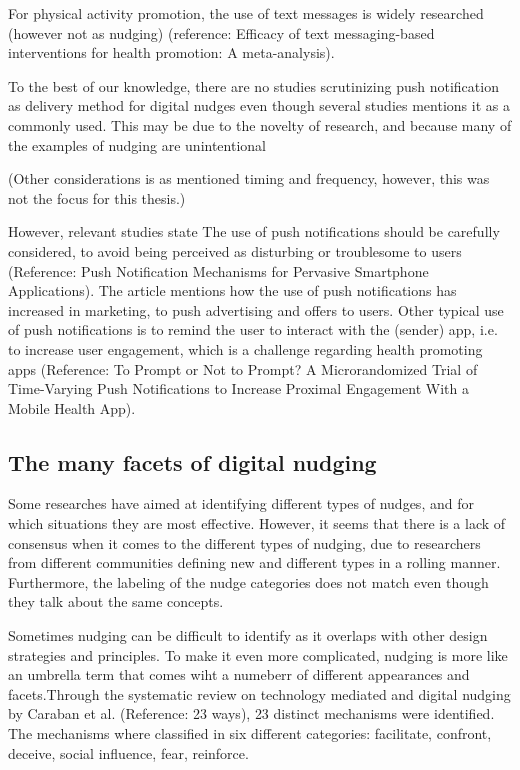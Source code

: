 For physical activity promotion, the use of text messages is widely researched (however not as nudging) (reference: Efficacy of text messaging-based interventions for health promotion: A meta-analysis). 

To the best of our knowledge, there are no studies scrutinizing push notification as delivery method for digital nudges even though several studies mentions it as a commonly used. This may be due to the novelty of research, and because many of the examples of nudging are unintentional

(Other considerations is as mentioned timing and frequency, however, this was not the focus for this thesis.) 


However, relevant studies state The use of push notifications should be carefully considered, to avoid being perceived as disturbing or troublesome to users (Reference: Push Notification Mechanisms for Pervasive Smartphone Applications). The article mentions how the use of push notifications has increased in marketing, to push advertising and offers to users. Other typical use of push notifications is to remind the user to interact with the (sender) app, i.e. to increase user engagement, which is a challenge regarding health promoting apps (Reference: To Prompt or Not to Prompt? A Microrandomized Trial of Time-Varying Push Notifications to Increase Proximal Engagement With a Mobile Health App).

\subsection{The many facets of digital nudging}
Some researches have aimed at identifying different types of nudges, and for which situations they are most effective. However, it seems that there is a lack of consensus when it comes to the different types of nudging, due to researchers from different communities defining new and different types in a rolling manner. Furthermore, the labeling of the nudge categories does not match even though they talk about the same concepts. 

Sometimes nudging can be difficult to identify as it overlaps with other design strategies and principles. To make it even more complicated, nudging is more like an umbrella term that comes wiht a numeberr of different appearances and facets.Through the systematic review on technology mediated and digital nudging by Caraban et al. (Reference: 23 ways), 23 distinct mechanisms were identified. The mechanisms where classified in six different categories: facilitate, confront, deceive, social influence, fear, reinforce. 


